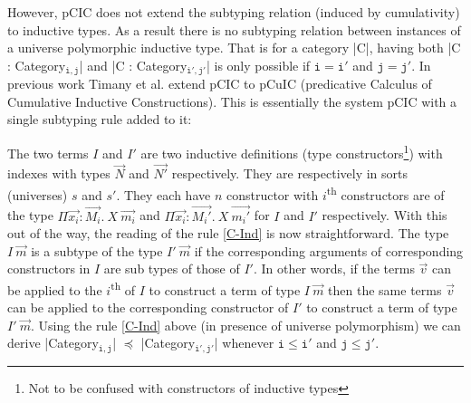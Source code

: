 \documentclass{easychair}
\begin{document}
However, pCIC does not extend the subtyping relation (induced by
cumulativity) to inductive types. As a result there is no subtyping
relation between instances of a universe polymorphic inductive type.
That is for a category \Coqe|C|, having both
\Coqe|C : Category$_{\mathtt{i, j}}$| and \Coqe|C : Category$_{\mathtt{i', j'}}$|
is only possible if $\mathtt{i = i'}$ and $\mathtt{j = j'}$.
In previous work Timany et al. \cite{DBLP:conf/ictac/Timany015} extend
pCIC to pCuIC (predicative Calculus of Cumulative Inductive
Constructions). This is essentially the system pCIC with a single
subtyping rule added to it:\footnotemark{}
\begin{mathpar}
\end{mathpar}
%
The two terms $I$ and $I'$ are two inductive definitions (type
constructors\footnote{Not to be confused with constructors of
  inductive types}) with indexes with types $\vec{N}$ and $\vec{N'}$
respectively. They are respectively in sorts (universes) $s$ and $s'$.
They each have $n$ constructor with $i$\textsuperscript{th}
constructors are of the type $\Pi\vec{x_i} : \vec{M_i}.~X~\vec{m_i}$
and $\Pi\vec{x_i} : \vec{M_i'}.~X~\vec{m_i'}$ for $I$ and $I'$
respectively. With this out of the way, the reading of the rule
\ref{C-Ind} is now straightforward. The type $I~\vec{m}$ is a subtype
of the type $I'~\vec{m}$ if the corresponding arguments of
corresponding constructors in $I$ are sub types of those of $I'$.  In
other words, if the terms $\vec{v}$ can be applied to the
$i$\textsuperscript{th} of $I$ to construct a term of type $I~\vec{m}$
then the same terms $\vec{v}$ can be applied to the corresponding
constructor of $I'$ to construct a term of type $I'~\vec{m}$.  %
Using the rule \ref{C-Ind} above (in presence of universe polymorphism)
we can derive
\Coqe|Category$_{\mathtt{i, j}}$| $\preceq$ \Coqe|Category$_{\mathtt{i', j'}}$|
whenever $\mathtt{i \le i'}$ and $\mathtt{j \le j'}$.
\end{document}

